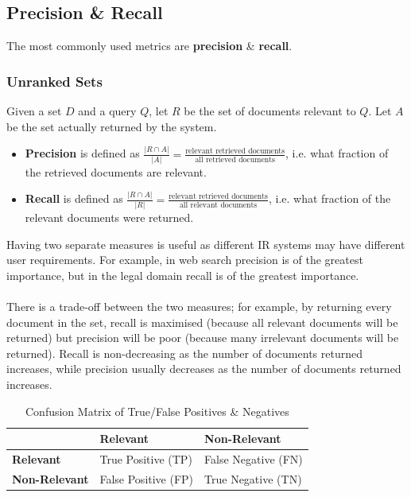 \documentclass[a4paper,11pt]{article}
\begin{document}
\subsection{Precision \& Recall}
The most commonly used metrics are \textbf{precision} \& \textbf{recall}.
\subsubsection{Unranked Sets}
Given a set $D$ and a query $Q$, let $R$ be the set of documents relevant to $Q$.
Let $A$ be the set actually returned by the system.
\begin{itemize}
    \item   \textbf{Precision} is defined as $\frac{|R \cap A|}{|A|} = \frac{\text{relevant retrieved documents}}{\text{all retrieved documents}}$, i.e. what fraction of the retrieved documents are relevant.
    \item   \textbf{Recall} is defined as $\frac{|R \cap A|}{|R|} = \frac{\text{relevant retrieved documents}}{\text{all relevant documents}}$, i.e. what fraction of the relevant documents were returned.
\end{itemize}

Having two separate measures is useful as different IR systems may have different user requirements.
For example, in web search precision is of the greatest importance, but in the legal domain recall is of the greatest
importance.
\\\\
There is a trade-off between the two measures; for example, by returning every document in the set, recall is 
maximised (because all relevant documents will be returned) but precision will be poor (because many irrelevant documents will be returned).
Recall is non-decreasing as the number of documents returned increases, while precision usually decreases as the
number of documents returned increases.

\begin{table}[h!]
    \centering
    \begin{tabular}{|p{}|p{}|p{}|}
        \hline
        & \textbf{Relevant} & \textbf{Non-Relevant} \\
        \hline
        \textbf{Relevant} & True Positive (TP) & False Negative (FN) \\
        \hline
        \textbf{Non-Relevant} & False Positive (FP) & True Negative (TN) \\
        \hline
    \end{tabular}
    \caption{Confusion Matrix of True/False Positives \& Negatives}
\end{table}
\end{document}
